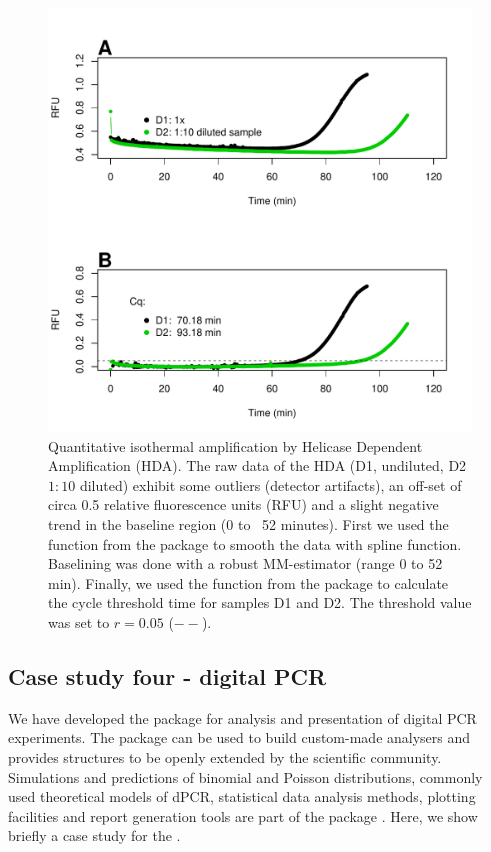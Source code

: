 \begin{figure}[htbp]
  \centering
  \includegraphics[clip=true, width=16cm]{figures/qIA.pdf}
  \caption{Quantitative isothermal amplification by Helicase Dependent 
Amplification (HDA).  The raw data of the HDA (D1, undiluted, D2 
$1:10$ diluted) exhibit some outliers (detector artifacts), an off-set of circa 
0.5 relative fluorescence units (RFU) and a slight negative trend in the 
baseline region (0 to ~52 minutes).  First we used the  
function from the  package to smooth the data with spline 
function. Baselining was done with a robust MM-estimator (range 0 to 52 min). 
Finally, we used the  function from the  package 
to calculate the cycle threshold time for samples D1 and D2. The threshold 
value 
was set to $r = 0.05$ ($--$).}
  \label{figure:qIA}
\end{figure}

\subsection{Case study four - digital PCR}

We have developed the  package for analysis and presentation of 
digital PCR experiments. The  package can be used to build 
custom-made analysers and provides structures to be openly extended by the 
scientific community. Simulations and predictions of binomial and Poisson 
distributions, commonly used theoretical models of dPCR, statistical data 
analysis methods, plotting facilities and report generation tools are part of 
the package \citep{pabinger_2014}. Here, we show briefly a case study for the 
.

